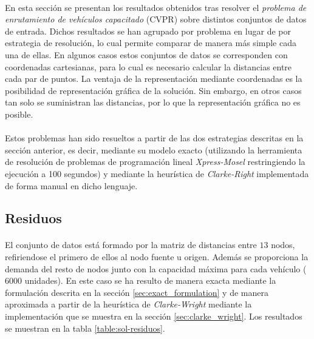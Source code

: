 \documentclass[spanish]{article}
\begin{document}
		\paragraph{}
		En esta sección se presentan los resultados obtenidos tras resolver el \emph{problema de enrutamiento de vehículos capacitado} (CVPR) sobre distintos conjuntos de datos de entrada. Dichos resultados se han agrupado por problema en lugar de por estrategia de resolución, lo cual permite comparar de manera más simple cada una de ellas. En algunos casos estos conjuntos de datos se corresponden con coordenadas cartesianas, para lo cual es necesario calcular la distancias entre cada par de puntos. La ventaja de la representación mediante coordenadas es la posibilidad de representación gráfica de la solución. Sin embargo, en otros casos tan solo se suministran las distancias, por lo que la representación gráfica no es posible.

		\paragraph{}
		Estos problemas han sido resueltos a partir de las dos estrategias descritas en la sección anterior, es decir, mediante su modelo exacto (utilizando la herramienta de resolución de problemas de programación lineal \emph{Xpress-Mosel}\cite{tool:xpress-mosel} restringiendo la ejecución a 100 segundos) y mediante la heurística de \emph{Clarke-Right} implementada de forma manual en dicho lenguaje.


		\subsection{Residuos}

			\paragraph{}
			El conjunto de datos está formado por la matriz de distancias entre $13$ nodos, refiriendose el primero de ellos al nodo fuente u origen. Además se proporciona la demanda del resto de nodos junto con la capacidad máxima para cada vehículo ($6000$ unidades). En este caso se ha resulto de manera exacta mediante la formulación descrita en la sección \ref{sec:exact_formulation} y de manera aproximada a partir de la heurística de \emph{Clarke-Wright} mediante la implementación que se muestra en la sección \ref{sec:clarke_wright}. Los resultados se muestran en la tabla \ref{table:sol-residuos}.
\end{document}
